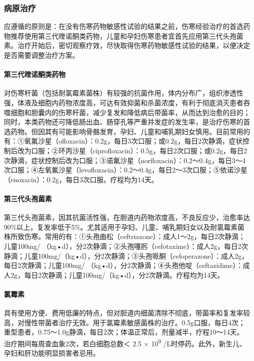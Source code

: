 \subsubsection{病原治疗}

应遵循的原则是：在没有伤寒药物敏感性试验的结果之前，伤寒经验治疗的首选药物推荐使用第三代喹诺酮类药物，儿童和孕妇伤寒患者宜首先应用第三代头孢菌素。治疗开始后，密切观察疗效，尽快取得伤寒药物敏感性试验的结果，以便决定是否需要调整治疗方案。

\paragraph{第三代喹诺酮类药物}

对伤寒杆菌（包括耐氯霉素菌株）有较强的抗菌作用，体内分布广，组织渗透性强，体液及细胞内药物浓度高，可达有效抑菌和杀菌浓度，有利于彻底消灭患者吞噬细胞和胆囊内的伤寒杆菌，减少复发和降低病后带菌率，从而达到治愈的目的；同时，本类药物还可降低肠出血、肠穿孔等严重并发症的发生率，是治疗伤寒的首选药物。但因其有可能影响骨骼发育，孕妇、儿童和哺乳期妇女慎用。目前常用的有：①氧氟沙星（ofloxacin）：0.2g，每日3次口服；或0.2g，每日2次静滴，症状控制后改为口服；②环丙沙星（ciprofloxacin）：0.5g，每日2次口服；或0.2g，每日2次静滴，症状控制后改为口服；③诺氟沙星（norfloxacin）：0.2～0.4g，每日3～4次口服；④左氧氟沙星（levofloxacin）：0.2～0.4g，每日2～3次口服；⑤依诺沙星（enoxacin）：0.2g，每日3次口服。疗程均为14天。

\paragraph{第三代头孢菌素}

第三代头孢菌素，因其抗菌活性强，在胆道内药物浓度高，不良反应少，治愈率达90\%以上，复发率低于5\%。尤其适用于孕妇、儿童、哺乳期妇女以及耐氯霉素菌株所致伤寒。常用的有：①头孢曲松（ceftriaxone）：成人1～2g，每日2次静滴；儿童100mg/
（kg•d），分2次静滴；②头孢噻肟（cefotaxime）：成人2g，每日2次静滴；儿童100mg/（kg•d），分2次静滴；③头孢哌酮（cefoperazone）：成人2g，每日2次静滴；儿童100mg/
（kg•d），分2次静滴；④头孢他啶（ceftazidime）：成人2g，每日2次静滴；儿童100mg/（kg•d），分2次静滴。疗程均为14天。

\paragraph{氯霉素}

具有使用方便、费用低廉的特点，但对胆道内细菌清除不彻底，带菌率和复发率较高，对慢性带菌者治疗无效。用于氯霉素敏感菌株的治疗。0.5g口服，每日4次；重型患者，0.75～1.0g静滴，每日2次；体温正常后，剂量减半，疗程10～14天。治疗期间每周查血象2次，若白细胞总数＜
2.5 × 10\textsuperscript{9}
/L时停药。此外，新生儿、孕妇和肝功能明显损害者忌用。

